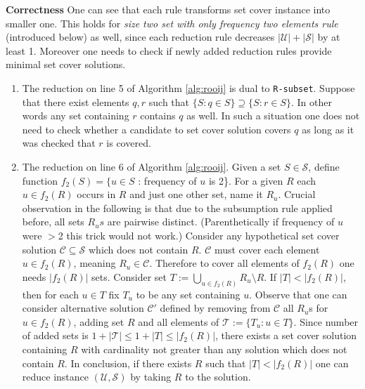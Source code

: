 \textbf{Correctness}
One can see that each rule transforms set cover instance into smaller one. This holds for \textit{size two set with only frequency two elements rule} (introduced below) as well, since each reduction rule decreases $|\mathcal{U}| + |\mathcal{S}|$ by at least 1. Moreover one needs to check if newly added reduction rules provide minimal set cover solutions.
\begin{enumerate}
    \item The reduction on line 5 of Algorithm \ref{alg:rooij} is dual to \texttt{R-subset}. Suppose that there exist elements $q, r$ such that $\{S : q \in S\} \supseteq \{S : r \in S\}$. In other words any set containing $r$ contains $q$ as well. In such a situation one does not need to check whether a candidate to set cover solution covers $q$ as long as it was checked that $r$ is covered.
    \item The reduction on line 6 of Algorithm \ref{alg:rooij}. Given a set $S \in \mathcal{S}$, define function $f_2(S) = \{u \in S$ : frequency of $u$ is 2\}. For a given $R$ each $u\in f_2(R)$ occurs in $R$ and just one other set, name it $R_u$. Crucial observation in the following is that due to the subsumption rule applied before, all sets $R_us$ are pairwise distinct. (Parenthetically if frequency of $u$ were $>$2 this trick would not work.) Consider any hypothetical set cover solution $\mathcal{C} \subseteq \mathcal{S}$ which does not contain $R$. $\mathcal{C}$ must cover each element $u\in f_2(R)$, meaning $R_u\in \mathcal{C}$. Therefore to cover all elements of $f_2(R)$ one needs $|f_2(R)|$ sets. Consider set $T := \bigcup_{u \in f_2(R)} R_u \setminus R$. If $|T| < |f_2(R)|$, then for each $u \in T$ fix $T_u$ to be any set containing $u$. Observe that one can consider alternative solution $\mathcal{C'}$ defined by removing from $\mathcal{C}$ all $R_u$s for $u \in f_2(R)$, adding set $R$ and all elements of $\mathcal{T} := \{T_u : u \in T\}$. Since number of added sets is $1 + |\mathcal{T}| \leq 1 + |T| \leq |f_2(R)|$, there exists a set cover solution containing $R$ with cardinality not greater than any solution which does not contain $R$. In conclusion, if there exists $R$ such that $|T| < |f_2(R)|$ one can reduce instance $(\mathcal{U}, \mathcal{S})$ by taking $R$ to the solution.

\end{enumerate}
